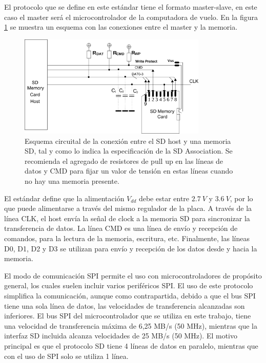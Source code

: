 El protocolo que se define en este estándar tiene el formato master-slave, en este caso el master será el microcontrolador de la computadora de vuelo. En la figura \ref{fig:SD_bus_conexiones} se muestra un esquema con las conexiones entre el master y la memoria.

\begin{figure}[htb]
    \centering
    \includegraphics[width=0.8\textwidth]{img/SD_bus_conexiones.png}
    \caption{Esquema circuital de la conexión entre el SD host y una memoria SD, tal y como lo indica la especificación de la SD Association. Se recomienda el agregado de resistores de pull up en las líneas de datos y CMD para fijar un valor de tensión en estas líneas cuando no hay una memoria presente.}
    \label{fig:SD_bus_conexiones}
\end{figure}

El estándar define que la alimentación $V_{dd}$ debe estar entre $2.7 \ V$ y $3.6 \ V$, por lo que puede alimentarse a través del mismo regulador de la placa. A través de la línea CLK, el host envía la señal de clock a la memoria SD para sincronizar la transferencia de datos. La línea CMD es una línea de envío y recepción de comandos, para la lectura de la memoria, escritura, etc. Finalmente, las líneas D0, D1, D2 y D3 se utilizan para envío y recepción de los datos desde y hacia la memoria.

El modo de comunicación SPI permite el uso con microcontroladores de propósito general, los cuales suelen incluir varios periféricos SPI. El uso de este protocolo simplifica la comunicación, aunque como  contrapartida, debido a que el bus SPI tiene una sola línea de datos, las velocidades de transferencia alcanzadas son inferiores. El bus SPI del microcontrolador que se utiliza en este trabajo, tiene una velocidad de transferencia máxima de 6,25 MB/s (50 MHz), mientras que la interfaz SD incluida alcanza velocidades de 25 MB/s (50 MHz). El motivo principal es que el protocolo SD tiene 4 líneas de datos en paralelo, mientras que con el uso de SPI solo se utiliza 1 línea.

